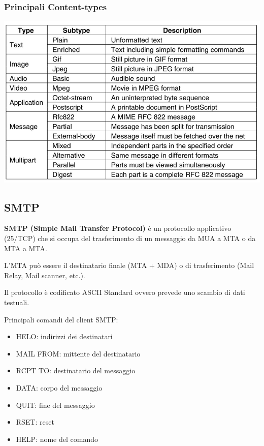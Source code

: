         \subsubsection{Principali Content-types}
            \begin{center}
                \includegraphics[scale=0.38]{chapters/6/assets/schema_g.png}
            \end{center}

    \subsection{SMTP}
        \textbf{SMTP (Simple Mail Transfer Protocol)} è un protocollo applicativo (25/TCP) che si occupa del trasferimento di un messaggio da MUA a MTA o da MTA a MTA.
    
        L'MTA può essere il destinatario finale (MTA + MDA) o di trasferimento (Mail Relay, Mail scanner, etc.).
    
        Il protocollo è codificato ASCII Standard ovvero prevede uno scambio di dati testuali.
    
        Principali comandi del client SMTP:
        \begin{itemize}
            \item HELO: indirizzi dei destinatari
            \item MAIL FROM: mittente del destinatario
            \item RCPT TO: destinatario del messaggio
            \item DATA: corpo del messaggio
            \item QUIT: fine del messaggio
            \item RSET: reset
            \item HELP: nome del comando
        \end{itemize}

